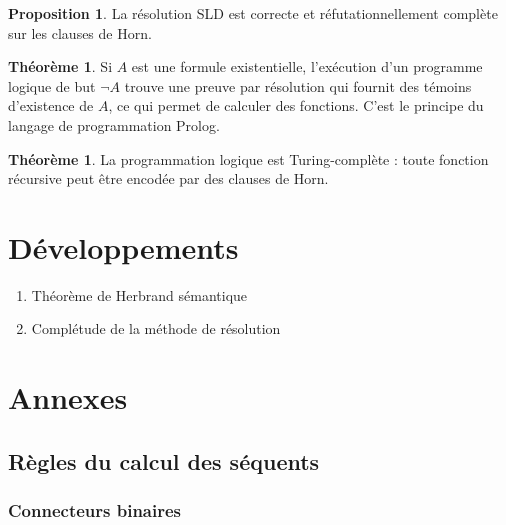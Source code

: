 \documentclass[a4paper, 11pt, twocolumn]{article}
\theoremstyle{definition}
\newtheorem{proposition}[equation]{Proposition}
\newtheorem{theorem}[equation]{Théorème}
\newcounter{n}
\begin{document}
\begin{proposition}
  La résolution SLD est correcte et réfutationnellement complète sur les clauses
  de Horn.
\end{proposition}

\begin{theorem}
  Si $A$ est une formule existentielle, l'exécution d'un programme logique de
  but $\lnot A$ trouve une preuve par résolution qui fournit des témoins
  d'existence de $A$, ce qui permet de calculer des fonctions. C'est le principe
  du langage de programmation Prolog.
\end{theorem}

\begin{theorem}
  La programmation logique est Turing-complète : toute fonction récursive peut
  être encodée par des clauses de Horn.
\end{theorem}

\section*{Développements}

\begin{enumerate}
\item Théorème de Herbrand sémantique
\item Complétude de la méthode de résolution
\end{enumerate}

\newpage

\section*{Annexes}

\subsection*{Règles du calcul des séquents}

\subsubsection*{Connecteurs binaires}
\end{document}
